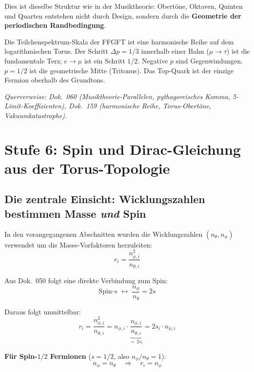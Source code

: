 Dies ist dieselbe Struktur wie in der Musiktheorie: Obertöne,
Oktaven, Quinten und Quarten entstehen nicht durch Design, sondern
durch die \textbf{Geometrie der periodischen Randbedingung}.

\begin{predbox}
Die Teilchenspektrum-Skala der FFGFT ist eine harmonische Reihe auf
dem logarithmischen Torus. Der Schritt $\Delta p = 1/3$ innerhalb einer Bahn
($\mu\to\tau$) ist die fundamentale Terz; $e\to\mu$ ist ein Schritt $1/2$.
Negative $p$ sind Gegenwindungen. $p = 1/2$ ist
die geometrische Mitte (Tritonus). Das Top-Quark ist der einzige
Fermion oberhalb des Grundtons.
\end{predbox}

\noindent\textit{Querverweise: Dok.~060 (Musiktheorie-Parallelen,
pythagoreisches Komma, 5-Limit-Koeffizienten),
Dok.~159 (harmonische Reihe, Torus-Obertöne, Vakuumkatastrophe).}

\section{Stufe 6: Spin und Dirac-Gleichung aus der Torus-Topologie}

\subsection{Die zentrale Einsicht: Wicklungszahlen bestimmen Masse \emph{und} Spin}

In den vorangegangenen Abschnitten wurden die Wicklungszahlen
$(n_\theta, n_\phi)$ verwendet um die Masse-Vorfaktoren herzuleiten:
\begin{equation}
    r_i = \frac{n_{\phi,i}^2}{n_{\theta,i}}
\end{equation}

Aus Dok.~050 folgt eine direkte Verbindung zum Spin:
\begin{equation}
    \text{Spin-}s \;\longleftrightarrow\; \frac{n_\phi}{n_\theta} = 2s
\end{equation}

Daraus folgt unmittelbar:
\begin{equation}
    \boxed{r_i = \frac{n_{\phi,i}^2}{n_{\theta,i}}
    = n_{\phi,i} \cdot \underbrace{\frac{n_{\phi,i}}{n_{\theta,i}}}_{=\,2s_i}
    = 2 s_i \cdot n_{\phi,i}}
\end{equation}

\textbf{Für Spin-$1/2$ Fermionen} ($s = 1/2$, also $n_\phi/n_\theta = 1$):
\begin{equation}
    n_\phi = n_\theta \quad \Rightarrow \quad r_i = n_\phi
\end{equation}

